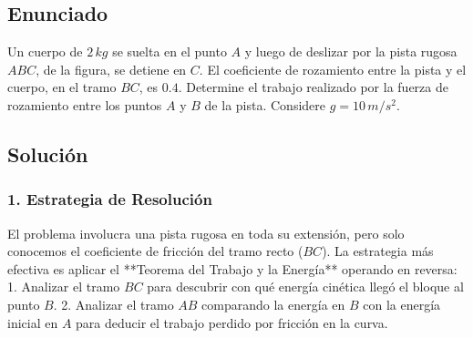 \documentclass[12pt, a4paper]{article}
\begin{document}
\newpage

\subsection*{Enunciado}
Un cuerpo de $2 \, \si{kg}$ se suelta en el punto $A$ y luego de deslizar por la pista rugosa $ABC$, de la figura, se detiene en $C$. El coeficiente de rozamiento entre la pista y el cuerpo, en el tramo $BC$, es $0.4$. Determine el trabajo realizado por la fuerza de rozamiento entre los puntos $A$ y $B$ de la pista. Considere $g = 10 \, \si{m/s^2}$.

\begin{center}
\end{center}

\subsection*{Solución}

\subsubsection*{1. Estrategia de Resolución}
El problema involucra una pista rugosa en toda su extensión, pero solo conocemos el coeficiente de fricción del tramo recto ($BC$). La estrategia más efectiva es aplicar el **Teorema del Trabajo y la Energía** operando en reversa:
1. Analizar el tramo $BC$ para descubrir con qué energía cinética llegó el bloque al punto $B$.
2. Analizar el tramo $AB$ comparando la energía en $B$ con la energía inicial en $A$ para deducir el trabajo perdido por fricción en la curva.
\end{document}
